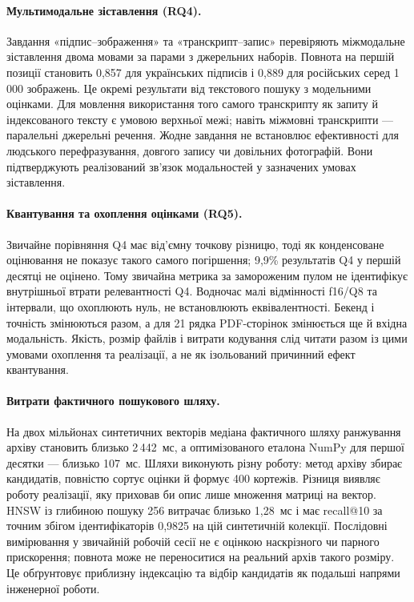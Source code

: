 \paragraph{Мультимодальне зіставлення (RQ4).}
Завдання «підпис--зображення» та «транскрипт--запис» перевіряють міжмодальне зіставлення двома мовами за парами з джерельних наборів. Повнота на першій позиції становить 0,857 для українських підписів і 0,889 для російських серед 1\,000 зображень. Це окремі результати від текстового пошуку з модельними оцінками. Для мовлення використання того самого транскрипту як запиту й індексованого тексту є умовою верхньої межі; навіть міжмовні транскрипти --- паралельні джерельні речення. Жодне завдання не встановлює ефективності для людського перефразування, довгого запису чи довільних фотографій. Вони підтверджують реалізований зв'язок модальностей у зазначених умовах зіставлення.

\paragraph{Квантування та охоплення оцінками (RQ5).}
Звичайне порівняння Q4 має від'ємну точкову різницю, тоді як конденсоване оцінювання не показує такого самого погіршення; 9,9\% результатів Q4 у першій десятці не оцінено. Тому звичайна метрика за замороженим пулом не ідентифікує внутрішньої втрати релевантності Q4. Водночас малі відмінності f16/Q8 та інтервали, що охоплюють нуль, не встановлюють еквівалентності. Бекенд і точність змінюються разом, а для 21 рядка PDF-сторінок змінюється ще й вхідна модальність. Якість, розмір файлів і витрати кодування слід читати разом із цими умовами охоплення та реалізації, а не як ізольований причинний ефект квантування.

\paragraph{Витрати фактичного пошукового шляху.}
На двох мільйонах синтетичних векторів медіана фактичного шляху ранжування архіву становить близько 2\,442~мс, а оптимізованого еталона NumPy для першої десятки --- близько 107~мс. Шляхи виконують різну роботу: метод архіву збирає кандидатів, повністю сортує оцінки й формує 400 кортежів. Різниця виявляє роботу реалізації, яку приховав би опис лише множення матриці на вектор. HNSW із глибиною пошуку 256 витрачає близько 1,28~мс і має recall@10 за точним збігом ідентифікаторів 0,9825 на цій синтетичній колекції. Послідовні вимірювання у звичайній робочій сесії не є оцінкою наскрізного чи парного прискорення; повнота може не переноситися на реальний архів такого розміру. Це обґрунтовує приблизну індексацію та відбір кандидатів як подальші напрями інженерної роботи.

